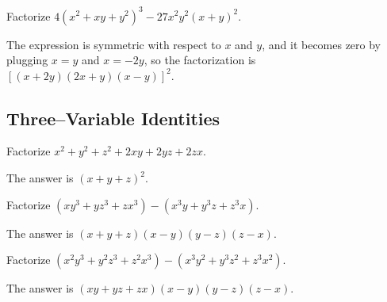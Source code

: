 \begin{tcolorbox}
\begin{question}
Factorize $4(x^2+xy+y^2)^3 - 27x^2y^2(x+y)^2$.
\end{question}
\end{tcolorbox}

\begin{solution}[name=Solution by Parviz Shahriari]
The expression is symmetric with respect to $x$ and $y$, and it becomes zero by plugging $x=y$ and $x=-2y$, so the factorization is $[(x+2y)(2x+y)(x-y)]^2$.
\end{solution}



\subsection{Three--Variable Identities}


\begin{tcolorbox}
\begin{question}
Factorize $x^2+y^2+z^2+2xy+2yz+2zx$.
\end{question}
\end{tcolorbox}

\begin{solution}
The answer is $(x+y+z)^2$.
\end{solution}

\begin{tcolorbox}
\begin{question}
Factorize $(xy^3+yz^3+zx^3) - (x^3y+y^3z+z^3x)$.
\end{question}
\end{tcolorbox}

\begin{solution}
The answer is $(x+y+z)(x-y)(y-z)(z-x)$.
\end{solution}

\begin{tcolorbox}
\begin{question}
Factorize $(x^2y^3+y^2z^3+z^2x^3) - (x^3y^2+y^3z^2+z^3x^2)$.
\end{question}
\end{tcolorbox}

\begin{solution}
The answer is $(xy+yz+zx)(x-y)(y-z)(z-x)$.
\end{solution}

